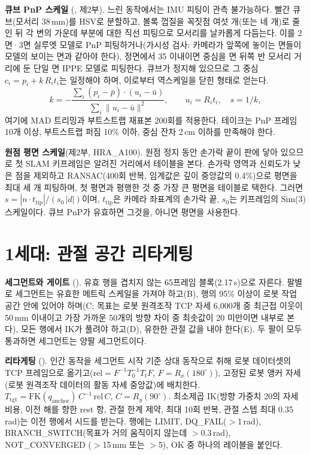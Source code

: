\documentclass[conference,10pt]{IEEEtran}
\newcommand{\mm}{\,mm\xspace}
\begin{document}
\textbf{큐브 PnP 스케일} (, 제2부). 느린 동작에서는 IMU 피팅이 관측 불가능하다. 빨간 큐브(모서리
38\mm)를 HSV로 분할하고, 볼록 껍질을 꼭짓점 여섯 개(또는 네 개)로 줄인 뒤 각 변의 가운데 부분에 대한 직선 피팅으로 모서리를
날카롭게 다듬는다. 이를 2면·3면 실루엣 모델로 PnP 피팅하거나(가시성 검사: 카메라가 앞쪽에 놓이는 면들이 모델의 보이는 면과 같아야
한다), 정면에서 35\textdegree{} 이내이면 중심을 면 뒤쪽 반 모서리 거리에 둔 단일 면 IPPE 모델로 피팅한다. 큐브가 정지해 있으므로 그
중심 $c_i=p_i + k\,R_i t_i$는 일정해야 하며, 이로부터 역스케일을 닫힌 형태로 얻는다.
\begin{equation}
k = -\frac{\sum_i (p_i-\bar p)\cdot(u_i-\bar u)}{\sum_i\lVert u_i-\bar u\rVert^2},\qquad u_i=R_i t_i,\quad s=1/k,
\end{equation}
여기에 MAD 트리밍과 부트스트랩 재표본 200회를 적용한다. 테이크는 PnP 프레임 10개 이상, 부트스트랩 퍼짐 10\% 이하, 중심 잔차
2\,cm 이하를 만족해야 한다.

\textbf{원점 평면 스케일}(제2부, HRA\_A100). 원점 정지 동안 손가락 끝이 판에 닿아 있으므로 첫 SLAM 키프레임은 알려진 거리에서
테이블을 본다. 손가락 영역과 신뢰도가 낮은 점을 제외하고 RANSAC(400회 반복, 임계값은 깊이 중앙값의 0.4\%)으로 평면을 최대 세 개
피팅하며, 첫 평면과 평행한 것 중 가장 큰 평면을 테이블로 택한다. 그러면 $s=|n\cdot t_\text{tip}|/(s_0\,|d|)$이며, $t_\text{tip}$은
카메라 좌표계의 손가락 끝, $s_0$는 키프레임의 Sim(3) 스케일이다. 큐브 PnP가 유효하면 그것을, 아니면 평면을 사용한다.

\section{1세대: 관절 공간 리타게팅}\label{sec:gen1}
\textbf{세그먼트와 게이트} (). 유효 행을 겹치지 않는 65프레임 블록(2.17\,s)으로 자른다. 팔별로 세그먼트는 유효한
메트릭 스케일을 가져야 하고(B), 행의 95\% 이상이 로봇 작업 공간 안에 있어야 하며(C; 목표는 로봇 원격조작 TCP 자세 6{,}000개 중
최근접 이웃이 50\mm{} 이내이고 가장 가까운 50개의 방향 차이 중 최솟값이 20\textdegree{} 미만이면 내부로 본다), 모든 행에서 IK가
풀려야 하고(D), 유한한 관절 값을 내야 한다(E). 두 팔이 모두 통과하면 세그먼트는 양팔 세그먼트이다.

\textbf{리타게팅} (). 인간 동작을 세그먼트 시작 기준 상대 동작으로 취해 로봇
데이터셋의 TCP 프레임으로 옮기고($\text{rel}=F^{-1}T_{0}^{-1}T_{t}F$, $F=R_x(180^\circ)$), 고정된 로봇 앵커 자세(로봇 원격조작
데이터의 활동 자세 중앙값)에 배치한다. $T_\text{tgt}=\mathrm{FK}(q_\text{anchor})\,C^{-1}\,\text{rel}\,C$, $C=R_y(90^\circ)$.
최소제곱 IK(방향 가중치 20의 자세 비용, 이전 해를 향한 rest 항, 관절 한계 제약, 최대 10회 반복, 관절 스텝 최대 0.35\,rad)는 이전
행에서 시드를 받는다. 행에는 LIMIT, DQ\_FAIL($>$1\,rad), BRANCH\_SWITCH(목표가 거의 움직이지 않는데 $>$0.3\,rad), NOT\_CONVERGED
($>$15\mm{} 또는 $>$5\textdegree), OK 중 하나의 레이블을 붙인다.
\end{document}
